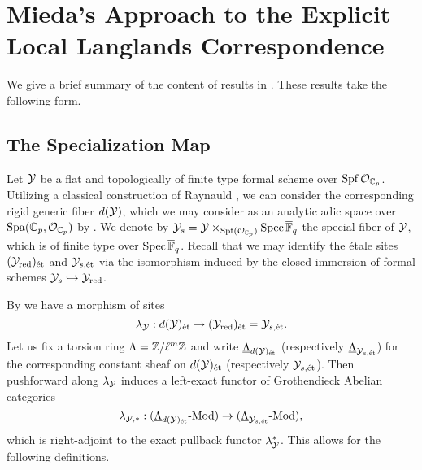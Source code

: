 \documentclass[../main.tex]{subfiles}
\begin{document}
\section{Mieda's Approach to the Explicit Local Langlands Correspondence} %
\label{sec:Mieda's Approach to the Explicit Local Langlands Correspondence}

We give a brief summary of the content of results in \cite{mieda2016geometric}.
These results take the following form. 

\subsection{The Specialization Map} %
\label{sub:The Injectivity FinLevel}
Let $\mathcal{Y}$ be a flat and topologically of finite type formal scheme over $\operatorname{Spf} \mathcal{O}_{\mathbb{C}_p}$.
Utilizing a classical construction of Raynauld \cite{raynaud1974geometrie}, we 
can consider the corresponding rigid generic fiber $d(\mathcal{Y})$, which we may
consider as an analytic adic space over $\operatorname{Spa}({\mathbb{C}_p},\mathcal{O}_{\mathbb{C}_p})$ by \cite[Section
1.9]{huber2013etale}. We denote by $\mathcal{Y}_s = \mathcal{Y} \times_{\operatorname{Spf}(\mathcal{O}_{\mathbb{C}_p})} \operatorname{Spec}
{\overline {\mathbb{F}}_q}$ the special fiber of $\mathcal{Y}$, which is of finite type over $\operatorname{Spec}
{\overline {\mathbb{F}}_q}$. Recall that we may identify the \'etale sites $(\mathcal{Y}_{\mathrm{red}})_{\textnormal{\'et}}$ and
$\mathcal{Y}_{s,\textnormal{\'et}}$ via the isomorphism induced by the closed immersion of formal schemes
$\mathcal{Y}_s \hookrightarrow \mathcal{Y}_{\mathrm{red}}$.

By \cite[Lemma 3.5.1]{huber2013etale} we have a morphism of sites
\begin{equation*}
  \lambda_{\mathcal{Y}} : d(\mathcal{Y})_{\textnormal{\'et}} \to (\mathcal{Y}_{\mathrm{red}})_{\textnormal{\'et}} = \mathcal{Y}_{s, \textnormal{\'et}}.
\end{equation*}
Let us fix a torsion ring $\Lambda = \mathbb{Z}/\ell^m \mathbb{Z}$ and write $\underline
\Lambda_{d(\mathcal{Y})_{\textnormal{\'et}}}$ (respectively $\underline \Lambda_{\mathcal{Y}_{s, \textnormal{\'et}}}$)
for the corresponding constant sheaf on $d(\mathcal{Y})_{\textnormal{\'et}}$ (respectively $\mathcal{Y}_{s,\textnormal{\'et}}$). Then 
pushforward along $\lambda_{\mathcal{Y}}$ induces a left-exact functor of Grothendieck
Abelian categories
\begin{equation*}
  \lambda_{\mathcal{Y},*}: {({\underline \Lambda_{d(\mathcal{Y})_{\textnormal{\'et}}}}\text-\allowbreak\mathrm{Mod})} \to {({\underline \Lambda_{\mathcal{Y}_{s, \textnormal{\'et}}}}\text-\allowbreak\mathrm{Mod})},
\end{equation*}
which is right-adjoint to the exact pullback functor $\lambda_{\mathcal{Y}}^*$.
This allows for the following definitions.
\end{document}
